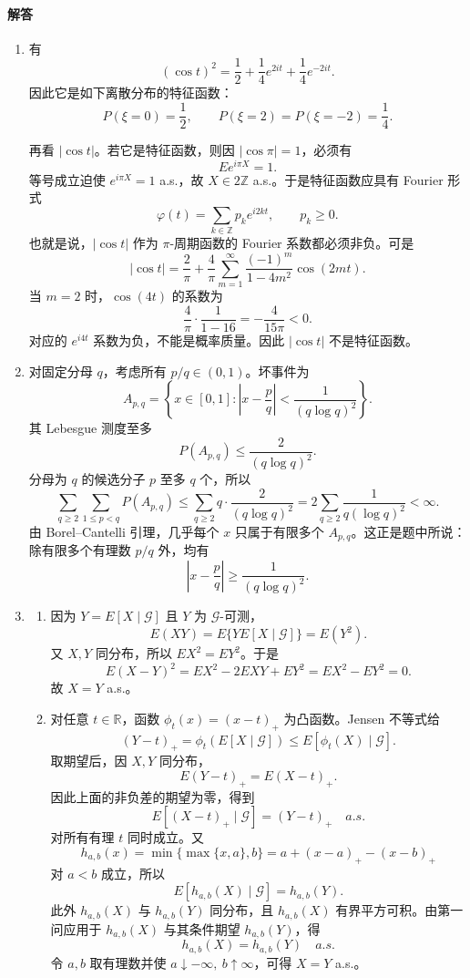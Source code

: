 \documentclass[UTF8,12pt]{ctexart}
\begin{document}
\paragraph{解答}
\begin{enumerate}[label=\textbf{\arabic*.},leftmargin=2.2em]
\item 有
\[
(\cos t)^2=\frac12+\frac14e^{2it}+\frac14e^{-2it}.
\]
因此它是如下离散分布的特征函数：
\[
P(\xi=0)=\frac12,\qquad P(\xi=2)=P(\xi=-2)=\frac14.
\]

再看 \(|\cos t|\)。若它是特征函数，则因 \(|\cos \pi|=1\)，必须有
\[
E e^{i\pi X}=1.
\]
等号成立迫使 \(e^{i\pi X}=1\) a.s.，故 \(X\in2\mathbb Z\) a.s.。于是特征函数应具有 Fourier 形式
\[
\varphi(t)=\sum_{k\in\mathbb Z}p_k e^{i2kt},\qquad p_k\ge0.
\]
也就是说，\(|\cos t|\) 作为 \(\pi\)-周期函数的 Fourier 系数都必须非负。可是
\[
|\cos t|=\frac2\pi+\frac4\pi\sum_{m=1}^{\infty}\frac{(-1)^m}{1-4m^2}\cos(2mt).
\]
当 \(m=2\) 时，\(\cos(4t)\) 的系数为
\[
\frac4\pi\cdot\frac1{1-16}=-\frac4{15\pi}<0.
\]
对应的 \(e^{i4t}\) 系数为负，不能是概率质量。因此 \(|\cos t|\) 不是特征函数。

\item 对固定分母 \(q\)，考虑所有 \(p/q\in(0,1)\)。坏事件为
\[
A_{p,q}=\left\{x\in[0,1]:\left|x-\frac pq\right|<\frac1{(q\log q)^2}\right\}.
\]
其 Lebesgue 测度至多
\[
P(A_{p,q})\le \frac{2}{(q\log q)^2}.
\]
分母为 \(q\) 的候选分子 \(p\) 至多 \(q\) 个，所以
\[
\sum_{q\ge2}\sum_{1\le p<q}P(A_{p,q})
\le \sum_{q\ge2} q\cdot \frac{2}{(q\log q)^2}
=2\sum_{q\ge2}\frac1{q(\log q)^2}<\infty.
\]
由 Borel--Cantelli 引理，几乎每个 \(x\) 只属于有限多个 \(A_{p,q}\)。这正是题中所说：除有限多个有理数 \(p/q\) 外，均有
\[
\left|x-\frac pq\right|\ge \frac1{(q\log q)^2}.
\]

\item
\begin{enumerate}[label=\textbf{(\arabic*)},leftmargin=2.4em]
\item 因为 \(Y=E[X\mid\mathcal G]\) 且 \(Y\) 为 \(\mathcal G\)-可测，
\[
E(XY)=E\{Y E[X\mid\mathcal G]\}=E(Y^2).
\]
又 \(X,Y\) 同分布，所以 \(E X^2=E Y^2\)。于是
\[
E(X-Y)^2=EX^2-2EXY+EY^2=EX^2-EY^2=0.
\]
故 \(X=Y\) a.s.。
\item 对任意 \(t\in\mathbb R\)，函数 \(\phi_t(x)=(x-t)_+\) 为凸函数。Jensen 不等式给
\[
(Y-t)_+=\phi_t(E[X\mid\mathcal G])\le E[\phi_t(X)\mid\mathcal G].
\]
取期望后，因 \(X,Y\) 同分布，
\[
E(Y-t)_+=E(X-t)_+.
\]
因此上面的非负差的期望为零，得到
\[
E[(X-t)_+\mid\mathcal G]=(Y-t)_+\quad a.s.
\]
对所有有理 \(t\) 同时成立。又
\[
h_{a,b}(x)=\min\{\max\{x,a\},b\}
=a+(x-a)_+-(x-b)_+
\]
对 \(a<b\) 成立，所以
\[
E[h_{a,b}(X)\mid\mathcal G]=h_{a,b}(Y).
\]
此外 \(h_{a,b}(X)\) 与 \(h_{a,b}(Y)\) 同分布，且 \(h_{a,b}(X)\) 有界平方可积。由第一问应用于 \(h_{a,b}(X)\) 与其条件期望 \(h_{a,b}(Y)\)，得
\[
h_{a,b}(X)=h_{a,b}(Y)\quad a.s.
\]
令 \(a,b\) 取有理数并使 \(a\downarrow-\infty,\ b\uparrow\infty\)，可得 \(X=Y\) a.s.。
\end{enumerate}


\end{enumerate}
\end{document}

